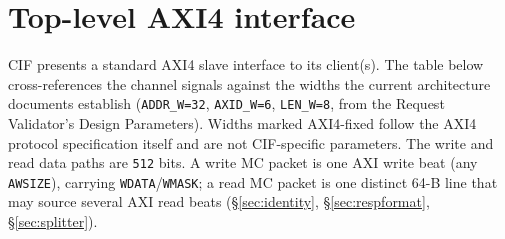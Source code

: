 \section{Top-level AXI4 interface}
\label{sec:axi4top}

CIF presents a standard AXI4 slave interface to its client(s).  The table
below cross-references the channel signals against the widths the current
architecture documents establish (\texttt{ADDR\_W=32}, \texttt{AXID\_W=6},
\texttt{LEN\_W=8}, from the Request Validator's Design Parameters).  Widths
marked AXI4-fixed follow the AXI4 protocol specification itself and are not
CIF-specific parameters.  The write and read data paths are \texttt{512}
bits.  A write MC packet is one AXI write beat (any \texttt{AWSIZE}), carrying
\texttt{WDATA}/\texttt{WMASK}; a read MC packet is one distinct 64-B line that
may source several AXI read beats (\S\ref{sec:identity},
\S\ref{sec:respformat}, \S\ref{sec:splitter}).


